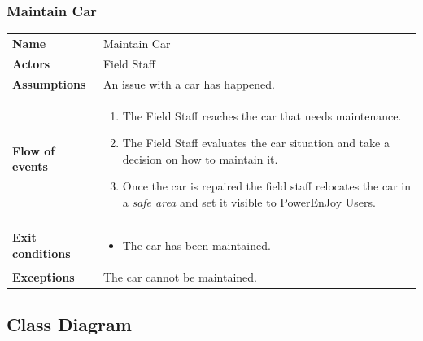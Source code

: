 \documentclass[english]{article}
\newcommand{\safearea}{\textit{safe area }}
\begin{document}
\subsubsection{Maintain Car}
	\begin{center}
	\begin{tabular}{l||p{10cm}}
	\textbf{Name} 
		&Maintain Car\\ [8px]
	\textbf{Actors} 
		& Field Staff\\ [8px]
	\textbf{Assumptions} 
		&An issue with a car has happened.\\
	\textbf{Flow of events}
		& \begin{enumerate}
			\item The Field Staff reaches the car that needs maintenance.
			\item The Field Staff evaluates the car situation and take a decision on how to maintain it. 
			\item Once the car is repaired the field staff relocates the car in a \safearea and set it visible to PowerEnJoy Users.
		\end{enumerate}\\ 
	\textbf{Exit conditions}
		&\begin{itemize}
			\item The car has been maintained.
		\end{itemize}\\
	\textbf{Exceptions}
		&The car cannot be maintained.\\[8px]
	\end{tabular}
	\end{center}

	\subsection{Class Diagram}
	\noindent
		\\
\end{document}
